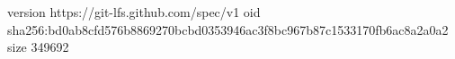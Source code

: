 version https://git-lfs.github.com/spec/v1
oid sha256:bd0ab8cfd576b8869270bcbd0353946ac3f8bc967b87c1533170fb6ac8a2a0a2
size 349692
